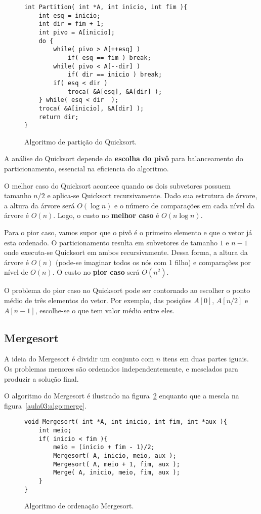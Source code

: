 \begin{figure}[!htb]
\centering
\begin{framed}
\begin{lstlisting}
int Partition( int *A, int inicio, int fim ){
	int esq = inicio;
	int dir = fim + 1;
	int pivo = A[inicio];
	do {
		while( pivo > A[++esq] )
			if( esq == fim ) break;
		while( pivo < A[--dir] )
			if( dir == inicio ) break;
		if( esq < dir )
			troca( &A[esq], &A[dir] );
	} while( esq < dir  );
	troca( &A[inicio], &A[dir] );
	return dir;
}
\end{lstlisting}
\end{framed}
\caption{Algoritmo de partição do Quicksort.}
\label{aula03:algo:partition}
\end{figure}

A análise do Quicksort depende da {\bf escolha do pivô} para balanceamento do
particionamento, essencial na eficiencia do algoritmo.

O melhor caso do Quicksort acontece quando os dois subvetores possuem tamanho
$n/2$ e aplica-se Quicksort recursivamente.
Dado sua estrutura de árvore, a altura da árvore será $O(\log n)$ e o número
de comparações em cada nível da árvore é $O(n)$. 
Logo, o custo no {\bf melhor caso} é $O(n \log n)$.

Para o pior caso, vamos supor que o pivô é o primeiro elemento e que o vetor já esta 
ordenado.  
O particionamento resulta em subvetores de tamanho $1$ e $n-1$ onde executa-se Quicksort
em ambos recursivamente.
Dessa forma, a altura da árvore é $O(n)$ (pode-se imaginar todos os nós com 1 filho)
e comparações por nível de $O(n)$.
O custo no {\bf pior caso} será $O(n^2)$.

O problema do pior caso no Quicksort pode ser contornado ao escolher o ponto médio
de três elementos do vetor.
Por exemplo, das posições $A[0]$, $A[n/2]$ e $A[n-1]$, escolhe-se o que tem
valor médio entre eles.

\subsection{Mergesort}

A ideia do Mergesort é dividir um conjunto com $n$ itens em duas partes iguais.
Os problemas menores são ordenados independentemente, e mesclados para
produzir a solução final.

O algoritmo do Mergesort é ilustrado na figura~\ref{aula03:algo:mergesort}
enquanto que a mescla na figura~\ref{aula03:algo:merge}.
%
\begin{figure}[!htb]
\centering
\begin{framed}
\begin{lstlisting}
void Mergesort( int *A, int inicio, int fim, int *aux ){
	int meio;
	if( inicio < fim ){
		meio = (inicio + fim - 1)/2;
		Mergesort( A, inicio, meio, aux );
		Mergesort( A, meio + 1, fim, aux );
		Merge( A, inicio, meio, fim, aux );
	}
}
\end{lstlisting}
\end{framed}
\caption{Algoritmo de ordenação Mergesort.}
\label{aula03:algo:mergesort}
\end{figure}

